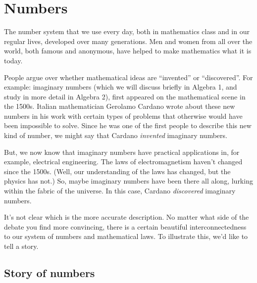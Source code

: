 \chapter{Numbers}
\label{ch:numbers}



The number system that we use every day, both in mathematics class and in our regular lives, developed over many generations. Men and women from all over the world, both famous and anonymous, have helped to make mathematics what it is today.

People argue over whether mathematical ideas are ``invented'' or ``discovered''. For example: \glspl{imaginary number} (which we will discuss briefly in Algebra 1, and study in more detail in Algebra 2), first appeared on the mathematical scene in the 1500s. Italian mathematician Gerolamo Cardano wrote about these new numbers in his work with certain types of problems that otherwise would have been impossible to solve. Since he was one of the first people to describe this new kind of number, we might say that Cardano \textit{invented} imaginary numbers.

But, we now know that imaginary numbers have practical applications in, for example, electrical engineering. The laws of electromagnetism haven't changed since the 1500s. (Well, our understanding of the laws has changed, but the physics has not.) So, maybe imaginary numbers have been there all along, lurking within the fabric of the universe. In this case, Cardano \textit{discovered} imaginary numbers.

It's not clear which is the more accurate description. No matter what side of the debate you find more convincing, there is a certain beautiful interconnectedness to our system of numbers and mathematical laws. To illustrate this, we'd like to tell a story.

\section{Story of numbers}
\label{sec:storyofnumbers}

\newenvironment{story}
{\begin{slshape}}
{\end{slshape}}

